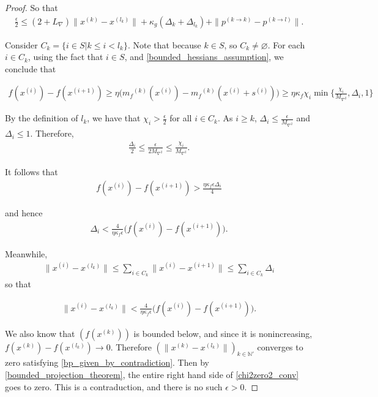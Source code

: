 \documentclass{article}
\theoremstyle{case}
\numberwithin{theorem}{subsection}
\newcommand{\dk}{\Delta_k}
\newcommand{\lipgrad}{{L_{\nabla}}}
\newcommand{\maxhessian}{{M_{\nabla^2}}}
\newcommand{\mfk}{{{m}_f}^{(k)}}
\newcommand{\naturals}{\mathbb N}
\newcommand{\xk}{{x^{(k)}}}
\begin{document}
\begin{proof}
So that
\begin{align}
\frac{\epsilon} 2 \le \left(2 + \lipgrad\right) \|\xk - x^{(l_k)}\| + \kappa_{g}\left(\dk + \Delta_{l_k}\right) + \| p^{(k\to k)} - p^{(k\to l)}\| \label{chi2zero2_conv}.
\end{align}

Consider $C_k = \{i \in S | k \le i < l_k\}$.
Note that because $k \in S$, so $C_k \ne \varnothing $.
For each $i \in C_k$, using the fact that $i \in S$, and \cref{bounded_hessians_assumption}, we conclude that 

\begin{align*}
f(x^{(i)}) - f(x^{(i+1)}) \ge \eta\big ( \mfk(x^{(i)}) - \mfk(x^{(i)} + s^{(i)}) \big ) \ge \eta \kappa_f \chi_i \min\{\frac{\chi_{i}}{\maxhessian}, \Delta_i, 1\} 
\end{align*}

By the definition of $l_k$, we have that $\chi_i > \frac{\epsilon}{2}$ for all $i \in C_k$.
As $i \ge k$, $\Delta_i \le \frac{\epsilon}{\maxhessian}$ and $\Delta_i \le 1$.
Therefore,
\begin{align*}
\frac{\Delta_i}{2} \le \frac{\epsilon}{2 \maxhessian} \le \frac{\chi_i}{\maxhessian}.
\end{align*}

It follows that
\begin{align*}
f(x^{(i)}) - f(x^{(i+1)}) > \frac{\eta \kappa_f \epsilon \Delta_i}{4}
\end{align*}

and hence
\begin{align*}
\Delta_i < \frac{4}{\eta \kappa_f \epsilon} \big ( f(x^{(i)}) - f(x^{(i+1)})\big ).
\end{align*}

Meanwhile,
\begin{align*}
\|x^{(i)} - x^{(l_k)}\| \le \sum_{i \in C_k}\|x^{(i)} - x^{(i+1)}\| \le \sum_{i \in C_k} \Delta_i
\end{align*}
so that

\begin{align}
\|x^{(i)} - x^{(l_k)}\| < \frac{4}{\eta \kappa_f \epsilon} \big ( f(x^{(i)}) - f(x^{(i+1)})\big ).
\end{align}

We also know that $(f(\xk))$ is bounded below, and since it is nonincreasing, $f(\xk)  - f(x^{(l_k)}) \to 0$.
Therefore $(\|\xk - x^{(l_k)}\|)_{k \in \naturals '}$ converges to zero satisfying \cref{bp_given_by_contradiction}.
Then by \cref{bounded_projection_theorem}, the entire right hand side of \cref{chi2zero2_conv} goes to zero.
This is a contraduction, and there is no such $\epsilon > 0$.
\end{proof}
\end{document}
